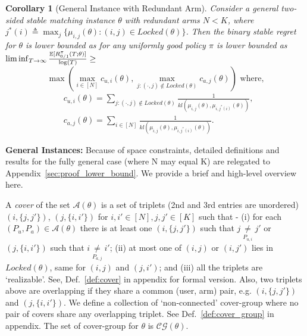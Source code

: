 \documentclass{article}
\newtheorem{corollary}{Corollary}[theorem]
\begin{document}
\begin{corollary}[General Instance with Redundant Arm]
Consider a general two-sided stable matching instance $\theta$ with redundant arms $N < K$,  where $j^*(i) \triangleq   \max_{j}\{ \mu_{i,j}(\theta): (i,j) \in Locked(\theta)\}$. Then the binary stable regret for $\theta$ is lower bounded as for any {\em uniformly good} policy $\pi$ is lower bounded as 
$\lim\inf_{T\to \infty} \tfrac{\mathbb{E}[R_{0/1}^{\pi}(T; \theta)]}{\log(T)} \geq \hfill$  $$\max\left(\max_{i \in [N]}c_{u,i}(\theta), 
 \max_{j: (\cdot, j) \notin Locked(\theta)}c_{a,j}(\theta)\right) \text{ where,}
$$
\begin{align*}
 &c_{u,i}(\theta) = \sum_{j: (\cdot,j) \notin Locked(\theta)} \tfrac{1}{kl(\mu_{i,j}(\theta), \mu_{i,j^*(i)}(\theta))},\\
 &c_{a,j}(\theta) =\sum_{i \in [N]} \tfrac{1}{kl(\mu_{i,j}(\theta), \mu_{i,j^*(i)}(\theta))}.
\end{align*}
\end{corollary}


\textbf{General Instances:} Because of space constraints, detailed definitions and results for the fully general case (where N may equal K) are relegated to Appendix~\ref{sec:proof_lower_bound}.  We provide a brief and high-level overview here. 

A {\em cover} of the set $\mathcal{A}(\theta)$  is a set of triplets (2nd and 3rd entries are unordered)  $(i, \{j, j'\})$, $(j, \{i, i'\})$ for $i, i'\in [N], j,j' \in [K]$  such that - (i) for each $(P_{u}, P_a) \in \mathcal{A}(\theta)$  there is at least one $(i, \{j, j'\})$ such that  $j \underset{P_{u,i}}{\neq} j'$ or $(j, \{i, i'\})$ such that $i \underset{P_{a,j}}{\neq} i'$; 
(ii) at most one of $(i, j)$ or $(i, j')$  lies in $Locked(\theta)$, same for $(i,j)$ and $(j,i')$; and 
(iii) all the triplets are `realizable'. See, Def.~\ref{def:cover} in appendix for formal version. 
Also, two triplets above are overlapping if they share a common (user, arm) pair, e.g. $(i,\{j,j'\})$ and $(j, \{i, i'\})$. We define a collection of `non-connected' cover-group where no pair of covers share any overlapping triplet. See Def.~\ref{def:cover_group} in appendix. The set of cover-group for $\theta$ is $\mathcal{CG}(\theta)$.
\end{document}
